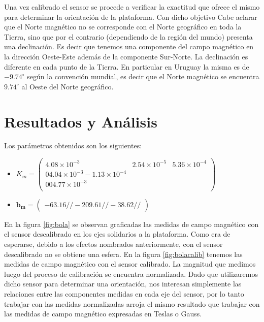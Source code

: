\documentclass[main]{subfiles}
\begin{document}
Una vez calibrado el sensor se procede a verificar la exactitud que ofrece el mismo para determinar la orientación de la plataforma. Con dicho objetivo 
Cabe aclarar que el Norte magn\'etico no se corresponde con el Norte geogr\'afico en toda la Tierra, sino que por el contrario (dependiendo de la regi\'on del mundo) presenta una declinaci\'on. Es decir que tenemos una componente del campo magn\'etico en la dirección Oeste-Este adem\'as de la componente Sur-Norte. La declinaci\'on es diferente en cada punto de la 
Tierra. En particular en Uruguay la misma es de $-9.74^{\circ}$ seg\'un la convenci\'on mundial, es decir que el Norte magn\'etico se encuentra $9.74^{\circ}$ al Oeste del Norte geogr\'afico. 

\section{Resultados y Análisis}
Los par\'ametros obtenidos son los siguientes:


\begin{itemize}
\item $K_m=\left( \begin{array}{ccc}
  4.08 \times 10^{-3}    &  2.54\times 10^{-5}  &    5.36\times 10^{-4}\\
                          0       4.04\times 10^{-3}     -1.13\times 10^{-4} \\
                         0                         0       4.77\times 10^{-3} \\
\end{array}
\right)
$

\item $
\mathbf{b_m}=\left(\begin{array}{c}
	-63.16//
    -209.61//
    -38.62//
\end{array}\right)
$
\end{itemize}


En la figura \ref{fig:bola} se observan graficadas las medidas de campo magnético con el sensor descalibrado en los ejes solidarios a la plataforma. Como era de esperarse, debido a los efectos nombrados anteriormente, con el sensor descalibrado no se obtiene una esfera. En la figura \ref{fig:bolacalib} tenemos las medidas de campo magnético con el sensor calibrado. La magnitud que medimos luego del proceso de calibración se encuentra normalizada. Dado que utilizaremos dicho sensor para determinar una orientación, nos interesan simplemente las relaciones entre las componentes medidas en cada eje del sensor, por lo tanto trabajar con las medidas normalizadas arroja el mismo resultado que trabajar con las medidas de campo magn\'etico expresadas en Teslas o Gauss.\\
\end{document}
